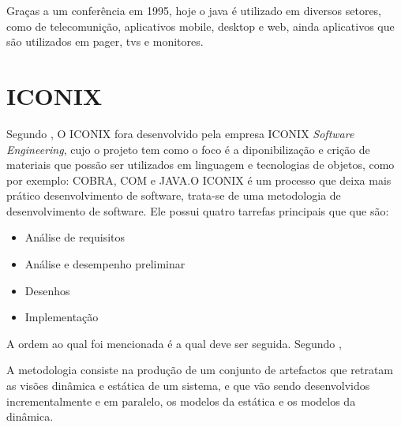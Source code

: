 \par Graças a um conferência em 1995, hoje o java é utilizado em diversos
setores, como de telecomunição, aplicativos mobile, desktop e web, ainda
aplicativos que são utilizados em pager, tvs e monitores.




\section{ICONIX}

\par  Segundo , O ICONIX fora desenvolvido pela
empresa ICONIX \textit{Software Engineering}, cujo o projeto tem como o foco é a
diponibilização e crição de materiais que possão ser utilizados em linguagem e
tecnologias de objetos, como por exemplo: COBRA, COM e JAVA.O ICONIX é um
processo que deixa mais prático  desenvolvimento de software, trata-se de uma metodologia de
desenvolvimento de software. Ele possui quatro tarrefas principais que que são:

\begin{itemize}
  \item Análise de requisitos
  \item Análise e desempenho preliminar
  \item Desenhos
  \item Implementação
\end{itemize}

\par A ordem ao qual foi mencionada é a qual
deve ser seguida. Segundo ,

\begin{citacao}
	A metodologia consiste na produção de um conjunto de artefactos que
    retratam as visões dinâmica e estática de um sistema, e que vão sendo
 	desenvolvidos incrementalmente e em paralelo, os modelos da estática
	e os modelos da dinâmica.
\end{citacao}






